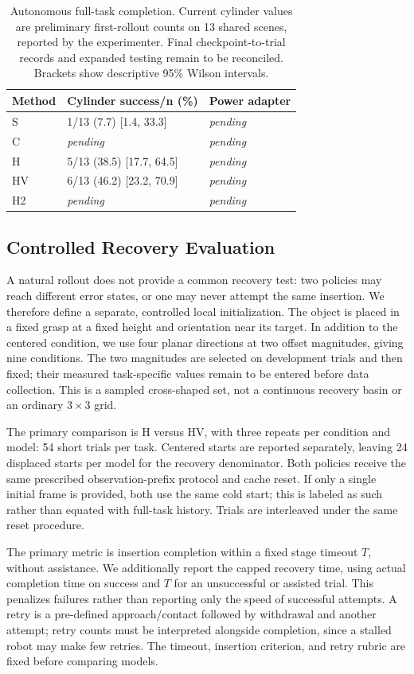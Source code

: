 \documentclass[letterpaper,10pt,conference]{ieeeconf}
\newcommand{\pending}{\textit{pending}}
\begin{document}
\begin{table}[t]
\centering\small
\caption{Autonomous full-task completion. Current cylinder values are preliminary first-rollout counts on 13 shared scenes, reported by the experimenter. Final checkpoint-to-trial records and expanded testing remain to be reconciled. Brackets show descriptive 95\% Wilson intervals.}
\label{tab:success}
\begin{tabular}{lll}
\toprule
Method & Cylinder success/n (\%) & Power adapter \\
\midrule
S & 1/13 (7.7) [1.4, 33.3] & \pending \\
C & \pending & \pending \\
H & 5/13 (38.5) [17.7, 64.5] & \pending \\
HV & 6/13 (46.2) [23.2, 70.9] & \pending \\
H2 & \pending & \pending \\
\bottomrule
\end{tabular}
\end{table}

\subsection{Controlled Recovery Evaluation}
A natural rollout does not provide a common recovery test: two policies may reach different error states, or one may never attempt the same insertion. We therefore define a separate, controlled local initialization. The object is placed in a fixed grasp at a fixed height and orientation near its target. In addition to the centered condition, we use four planar directions at two offset magnitudes, giving nine conditions. The two magnitudes are selected on development trials and then fixed; their measured task-specific values remain to be entered before data collection. This is a sampled cross-shaped set, not a continuous recovery basin or an ordinary $3\times3$ grid.

The primary comparison is H versus HV, with three repeats per condition and model: 54 short trials per task. Centered starts are reported separately, leaving 24 displaced starts per model for the recovery denominator. Both policies receive the same prescribed observation-prefix protocol and cache reset. If only a single initial frame is provided, both use the same cold start; this is labeled as such rather than equated with full-task history. Trials are interleaved under the same reset procedure.

The primary metric is insertion completion within a fixed stage timeout $T$, without assistance. We additionally report the capped recovery time, using actual completion time on success and $T$ for an unsuccessful or assisted trial. This penalizes failures rather than reporting only the speed of successful attempts. A retry is a pre-defined approach/contact followed by withdrawal and another attempt; retry counts must be interpreted alongside completion, since a stalled robot may make few retries. The timeout, insertion criterion, and retry rubric are fixed before comparing models.
\end{document}
